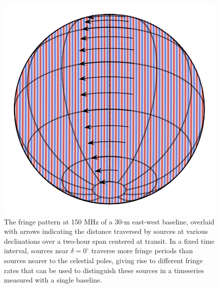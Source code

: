 \documentclass[twocolumn,apj,numberedappendix]{emulateapj}
\begin{document}
\begin{figure}
\includegraphics[width=.9\columnwidth]{plots/ew_fringe}
\caption{
The fringe pattern at 150 MHz of a 30-m east-west baseline, overlaid with arrows indicating
the distance traversed by sources at various declinations over a two-hour span centered at transit.
In a fixed time interval, sources near $\delta=0^\circ$ traverse more 
fringe periods than sources nearer to the celestial poles, giving rise to different
fringe rates that can be used to distinguish these sources in a timeseries measured with a single baseline.
}\label{fig:ew_fringe}
\end{figure}
\end{document}
